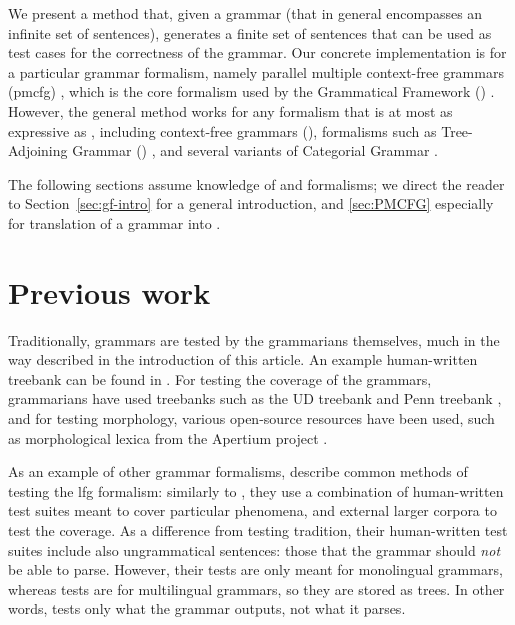 We present a method that, given a grammar (that in general encompasses
an infinite set of sentences), generates a finite set of sentences
that can be used as test cases for the correctness of the grammar. Our
concrete implementation is for a particular grammar formalism,
namely parallel multiple context-free grammars ({\sc pmcfg})
\cite{seki91pmcfg}, which is the core formalism used by the
Grammatical Framework (\gf) \cite{ranta2004gf}. However, the general
method works for any formalism that is at most as expressive as
\pmcfg{}, including context-free grammars (\cfg), formalisms such as Tree-Adjoining Grammar (\tag)
\cite{joshi1975tag}, and several variants of Categorial Grammar
\cite{deGroote2004,steedman1988ccg}.

The following sections assume knowledge of \gf{} and \pmcfg{}
formalisms; we direct the reader to Section~\ref{sec:gf-intro} for a
general \gf{} introduction, and \ref{sec:PMCFG} especially for
translation of a \gf{} grammar into \pmcfg{}.


\section{Previous work}

Traditionally, \gf{} grammars are tested by the grammarians themselves,
much in the way described in the introduction of this article. An example
human-written treebank can be found in \cite[p.~136--142]{khegai2006phd}.
For testing the coverage of the grammars, grammarians have used
treebanks such as the UD treebank \cite{nivre2016ud} and Penn treebank
\cite{marcus1993penntreebank}, and for testing morphology, various open-source resources
have been used, such as morphological lexica from the Apertium
project \cite{forcada2011apertium}.



As an example of other grammar formalisms,
\cite[pp.~212--213]{butt1999lfg} describe common methods of testing
the {\sc lfg} formalism: similarly to \gf, they use a combination of
human-written test suites meant to cover particular phenomena, and
external larger corpora to test the coverage. As a difference from \gf{}
testing tradition, their human-written test suites include also
ungrammatical sentences: those that the grammar should \emph{not} be
able to parse. However, their tests are only meant for monolingual
grammars, whereas \gf{} tests are for multilingual grammars, so they are
stored as trees. In other words, \gf{} tests only what the grammar
outputs, not what it parses.

